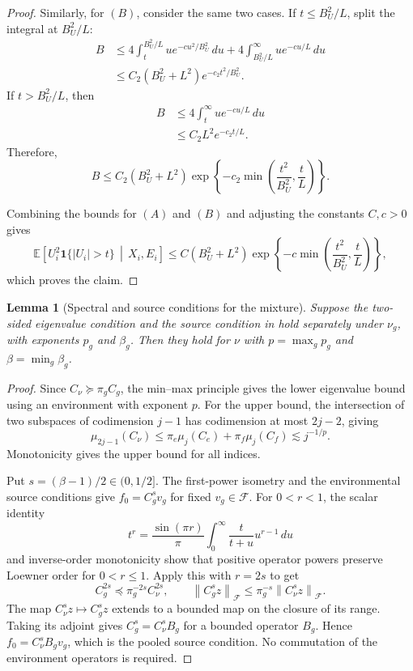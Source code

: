 \documentclass[11pt]{article}
\newtheorem{lemma}{Lemma}[section]
\newcommand{\E}{\mathbb{E}}
\newcommand{\F}{\mathcal{F}}
\newcommand{\norm}[1]{\left\lVert #1\right\rVert}
\begin{document}
\begin{proof}
Similarly, for $(B)$, consider the same two cases. If
$t\leq B_U^2/L$, split the integral at
$B_U^2/L$:
\begin{align*}
B
&\leq
4\int_t^{B_U^2/L}
u e^{-cu^2/B_U^2}\,du
+
4\int_{B_U^2/L}^\infty
u e^{-cu/L}\,du
\\
&\leq
C_2(B_U^2+L^2)
e^{-c_2t^2/B_U^2}.
\end{align*}
If $t>B_U^2/L$, then
\begin{align*}
B
&\leq
4\int_t^\infty
u e^{-cu/L}\,du
\\
&\leq
C_2L^2e^{-c_2t/L}.
\end{align*}
Therefore,
\[
B
\leq
C_2(B_U^2+L^2)
\exp\!\left\{
    -c_2\min\left(
        \frac{t^2}{B_U^2},
        \frac{t}{L}
    \right)
\right\}.
\]

Combining the bounds for $(A)$ and $(B)$ and adjusting the constants
$C,c>0$ gives
\[
\E\!\left[
    U_i^2\bm{1}\{|U_i|>t\}
    \,\middle|\,X_i,E_i
\right]
\leq
C(B_U^2+L^2)
\exp\!\left\{
    -c\min\left(
        \frac{t^2}{B_U^2},
        \frac{t}{L}
    \right)
\right\},
\]
which proves the claim.
\end{proof}




\begin{lemma}[Spectral and source conditions for the mixture]\label{lem:mixture_source}
Suppose the two-sided eigenvalue condition and the source condition in  hold separately under $\nu_g$, with exponents $p_g$ and $\beta_g$. Then they hold for $\nu$ with $p=\max_gp_g$ and $\beta=\min_g\beta_g$.
\end{lemma}
\begin{proof}
Since $C_\nu\succeq\pi_gC_g$, the min--max principle gives the lower eigenvalue bound using an environment with exponent $p$. For the upper bound, the intersection of two subspaces of codimension $j-1$ has codimension at most $2j-2$, giving
\[
 \mu_{2j-1}(C_\nu)\leq\pi_e\mu_j(C_e)+\pi_f\mu_j(C_f)\lesssim j^{-1/p}.
\]
Monotonicity gives the upper bound for all indices.

Put $s=(\beta-1)/2\in(0,1/2]$. The first-power isometry and the environmental source conditions give $f_0=C_g^sv_g$ for fixed $v_g\in\F$. For $0<r<1$, the scalar identity
\[
 t^r=\frac{\sin(\pi r)}\pi\int_0^\infty\frac{t}{t+u}u^{r-1}\,du
\]
and inverse-order monotonicity show that positive operator powers preserve Loewner order for $0<r\leq1$. Apply this with $r=2s$ to get
\[
 C_g^{2s}\preceq\pi_g^{-2s}C_\nu^{2s},\qquad
 \norm{C_g^sz}_{\F}\leq\pi_g^{-s}\norm{C_\nu^sz}_{\F}.
\]
The map $C_\nu^sz\mapsto C_g^sz$ extends to a bounded map on the closure of its range. Taking its adjoint gives $C_g^s=C_\nu^sB_g$ for a bounded operator $B_g$. Hence $f_0=C_\nu^sB_gv_g$, which is the pooled source condition. No commutation of the environment operators is required.
\end{proof}
\end{document}
